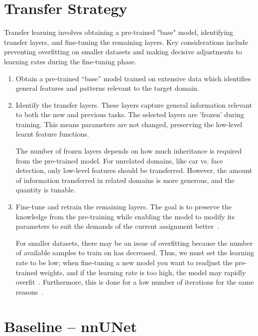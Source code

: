 \documentclass[12pt,twoside]{report}
\begin{document}
\section{Transfer Strategy}

Transfer learning involves obtaining a pre-trained "base" model, identifying transfer layers, and fine-tuning the remaining layers. Key considerations include preventing overfitting on smaller datasets and making decisive adjustments to learning rates during the fine-tuning phase.

\begin{enumerate}
  \item Obtain a pre-trained ``base'' model trained on extensive data which identifies general features and patterns relevant to the target domain.
  
  \item Identify the transfer layers. These layers capture general information relevant to both the new and previous tasks. The selected layers are 'frozen' during training. This means parameters are not changed, preserving the low-level learnt feature functions. 
  
  The number of frozen layers depends on how much inheritance is required from the pre-trained model. For unrelated domains, like car vs. face detection, only low-level features should be transferred. However, the amount of information transferred in related domains is more generous, and the quantity is tunable.
  
  \item Fine-tune and retrain the remaining layers. The goal is to preserve the knowledge from the pre-training while enabling the model to modify its parameters to suit the demands of the current assignment better~\cite{geeks-transfer-learning}.
  
  For smaller datasets, there may be an issue of overfitting because the number of available samples to train on has decreased. Thus, we must set the learning rate to be low; when fine-tuning a new model you want to readjust the pre-trained weights, and if the learning rate is too high, the model may rapidly overfit~\cite{geeks-transfer-learning}. Furthermore, this is done for a low number of iterations for the same reasons~\cite{deep-learning-book}.
\end{enumerate}

\section{Baseline -- nnUNet}
\end{document}
